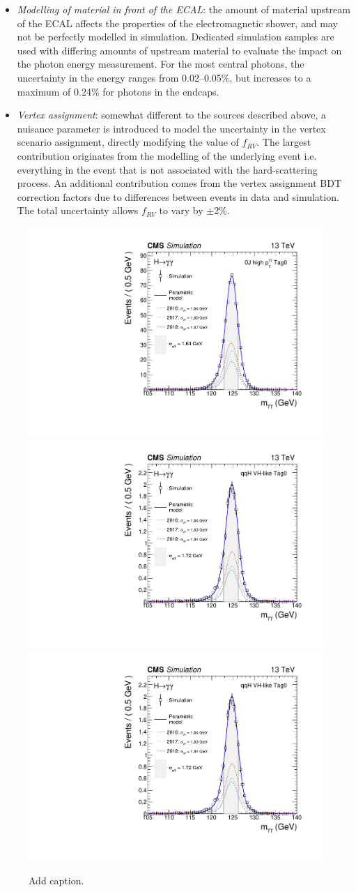 \begin{itemize}
    \item \textit{Modelling of material in front of the ECAL}: the amount of material upstream of the ECAL affects the properties of the electromagnetic shower, and may not be perfectly modelled in simulation. Dedicated simulation samples are used with differing amounts of upstream material to evaluate the impact on the photon energy measurement. For the most central photons, the uncertainty in the energy ranges from 0.02--0.05\%, but increases to a maximum of 0.24\% for photons in the endcaps.
    
    \item \textit{Vertex assignment}: somewhat different to the sources described above, a nuisance parameter is introduced to model the uncertainty in the vertex scenario assignment, directly modifying the value of $f_{RV}$. The largest contribution originates from the modelling of the underlying event i.e. everything in the event that is not associated with the hard-scattering process. An additional contribution comes from the vertex assignment BDT correction factors due to differences between \Zmumu events in data and simulation. The total uncertainty allows $f_{RV}$ to vary by $\pm$2\%.
\end{itemize}

\begin{figure}[hptb]
  \centering
  \includegraphics[width=.32\textwidth]{Figures/hgg_stats/smodel_RECO_0J_PTH_GT10_Tag0.pdf}
  \includegraphics[width=.32\textwidth]{Figures/hgg_stats/smodel_RECO_VBFTOPO_VHHAD_Tag0.pdf}
  \includegraphics[width=.32\textwidth]{Figures/hgg_stats/smodel_RECO_VBFTOPO_VHHAD_Tag0.pdf}
  \caption[Affect of the signal shape systematic uncertainties]
  {
    Add caption.
  }
  \label{fig:systematics_sigshape}
\end{figure}


